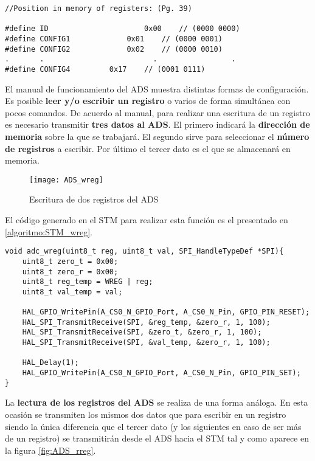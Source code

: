 \begin{lstlisting}[label=algoritmo:STM_ADS_def,style = STM-code,frame=single,caption=Ejemplo de definiciones de los registros y funciones del ADS]
//Position in memory of registers: (Pg. 39)

#define ID 						0x00	// (0000 0000)
#define CONFIG1  		 	0x01	// (0000 0001) 
#define CONFIG2  			0x02 	// (0000 0010)
.		.						  .					.
#define CONFIG4   		0x17 	// (0001 0111)
\end{lstlisting}

El manual de funcionamiento del ADS muestra distintas formas de configuración. Es posible \textbf{leer y/o escribir un registro} o varios de forma simultánea con pocos comandos. De acuerdo al manual, para realizar una escritura de un registro es necesario transmitir \textbf{tres datos al ADS}. El primero indicará la \textbf{dirección de memoria} sobre la que se trabajará. El segundo sirve para seleccionar el \textbf{número de registros} a escribir. Por último el tercer dato es el que se almacenará en memoria.

\begin{figure} [H]
    \centering
    \texttt{[image: ADS\_wreg]}
    \caption{Escritura de dos registros del ADS \cite{Datasheet_ADS}}
    \label{fig:ADS_wreg}
\end{figure}

El código generado en el STM para realizar esta función es el presentado en \ref{algoritmo:STM_wreg}.

\begin{lstlisting}[label=algoritmo:STM_wreg,style = STM-code,frame=single,caption=Escritura en registros del ADS]
void adc_wreg(uint8_t reg, uint8_t val, SPI_HandleTypeDef *SPI){
	uint8_t zero_t = 0x00;
	uint8_t zero_r = 0x00;
	uint8_t reg_temp = WREG | reg;
	uint8_t val_temp = val;
	
	HAL_GPIO_WritePin(A_CS0_N_GPIO_Port, A_CS0_N_Pin, GPIO_PIN_RESET);
	HAL_SPI_TransmitReceive(SPI, &reg_temp, &zero_r, 1, 100);
	HAL_SPI_TransmitReceive(SPI, &zero_t, &zero_r, 1, 100);	
	HAL_SPI_TransmitReceive(SPI, &val_temp, &zero_r, 1, 100);	

	HAL_Delay(1);
	HAL_GPIO_WritePin(A_CS0_N_GPIO_Port, A_CS0_N_Pin, GPIO_PIN_SET);
}
\end{lstlisting}

La \textbf{lectura de los registros del ADS} se realiza de una forma análoga. En esta ocasión se transmiten los mismos dos datos que para escribir en un registro siendo la única diferencia que el tercer dato (y los siguientes en caso de ser más de un registro) se transmitirán desde el ADS hacia el STM tal y como aparece en la figura \ref{fig:ADS_rreg}.

